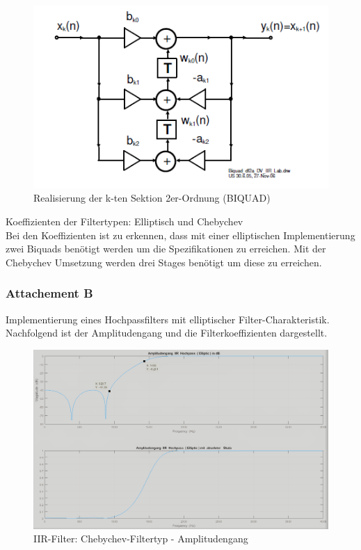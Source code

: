 \begin{figure}[h]
\centering
\includegraphics[width=0.7\linewidth]{Bilder/BIQUAD}
\caption{ Realisierung der k-ten Sektion 2er-Ordnung (BIQUAD)}
\label{fig:BIQUAD}
\end{figure}

\clearpage



\noindent Koeffizienten der Filtertypen: Elliptisch und Chebychev\\
Bei den Koeffizienten ist zu erkennen, dass mit einer elliptischen Implementierung zwei Biquads benötigt werden um die Spezifikationen zu erreichen. Mit der Chebychev Umsetzung werden drei Stages benötigt um diese zu erreichen.\\






\clearpage

\subsubsection{Attachement B}
Implementierung eines Hochpassfilters mit elliptischer Filter-Charakteristik. Nachfolgend ist der Amplitudengang und die Filterkoeffizienten dargestellt.

\begin{figure}[h]
\centering
\includegraphics[width=0.7\linewidth]{Bilder/Attachment_B_ELLIP}
\caption{IIR-Filter: Chebychev-Filtertyp - Amplitudengang}
\label{fig:Attachment_B_ELLIP}
\end{figure}


